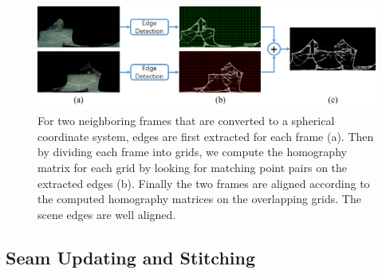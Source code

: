 \documentclass[conference]{IEEEtran}
\begin{document}
\begin{figure}[!htpb]
\centering
\includegraphics[scale=0.35]{picture41.png}
\caption{For two neighboring frames that are converted to a spherical coordinate system, edges are first extracted for each frame (a). Then by dividing each frame into grids,  we compute the homography matrix for each grid by looking for matching point pairs on the extracted edges (b).
Finally the two frames are aligned according to the computed homography matrices on the overlapping grids. The scene edges are well aligned.}
\label{fig:p8}
\end{figure}

\subsection{Seam Updating and Stitching}
\label{ssec:stitching}
\end{document}
